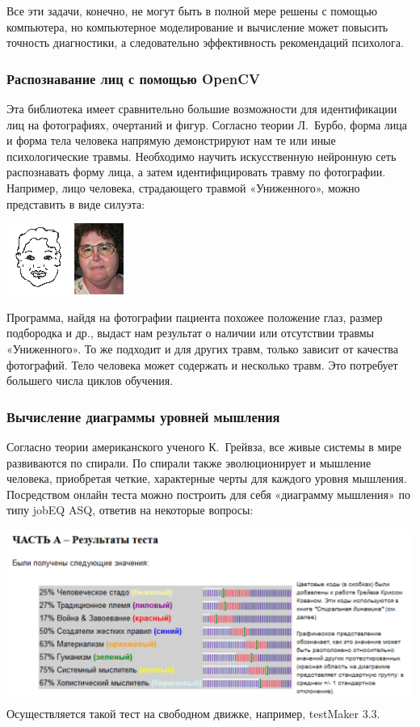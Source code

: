 \documentclass[10pt, a5paper]{article}
\begin{document}
Все эти задачи, конечно, не могут быть в полной мере решены с помощью компьютера, но компьютерное моделирование и вычисление может повысить точность диагностики, а следовательно эффективность рекомендаций психолога.

\subsubsection*{Распознавание лиц с помощью OpenCV}

Эта библиотека имеет сравнительно большие возможности для идентификации лиц на фотографиях, очертаний и фигур. Согласно теории Л.~Бурбо, форма лица и форма тела человека напрямую демонстрируют нам те или иные психологические травмы. Необходимо научить искусственную нейронную сеть распознавать форму лица, а затем идентифицировать травму по фотографии. Например, лицо человека, страдающего травмой «Униженного», можно представить в виде силуэта:
\begin{center}
  \includegraphics{111_2014_w_Kononova_face.png}
\end{center}

Программа, найдя на фотографии пациента похожее положение глаз, размер подбородка и др., выдаст нам результат о наличии или отсутствии травмы «Униженного». То же подходит и для других травм, только зависит от качества фотографий. Тело человека может содержать и несколько травм. Это потребует большего числа циклов обучения.

\subsubsection*{Вычисление диаграммы уровней мышления}

Согласно теории американского ученого К.~Грейвза, все живые системы в мире развиваются по спирали. По спирали также эволюционирует и мышление человека, приобретая четкие, характерные черты для каждого уровня мышления. Посредством онлайн теста можно построить для себя «диаграмму мышления» по типу jobEQ ASQ, ответив на некоторые вопросы:
\begin{center}
  \includegraphics[width=\textwidth]{111_2014_w_Kononova_results.png}
	Осуществляется такой тест на свободном движке, например, testMaker 3.3.
\end{center}
\end{document}
